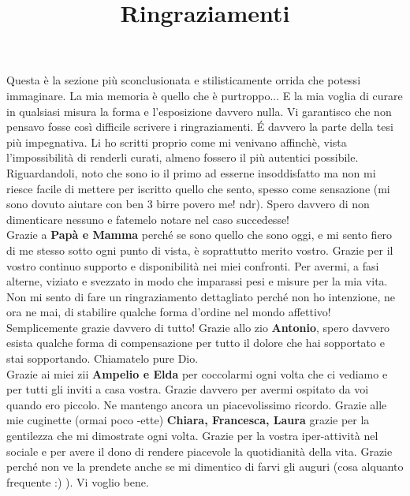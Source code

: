 \documentclass[10pt]{amsart}
\title{Ringraziamenti}
\newcommand{\n}[1]{{\Large \bf #1}}
\begin{document}
\maketitle
Questa è la sezione più sconclusionata e stilisticamente orrida che potessi immaginare. La mia memoria è quello che è purtroppo... E la mia voglia di curare in qualsiasi misura la forma e l'esposizione davvero nulla.
Vi garantisco che non pensavo fosse così difficile scrivere i ringraziamenti. \'E davvero la parte della tesi più impegnativa. Li ho scritti proprio come mi venivano affinchè, vista l'impossibilità di renderli curati, almeno fossero il più autentici possibile. Riguardandoli, noto che sono io il primo ad esserne insoddisfatto ma non mi riesce facile di mettere per iscritto quello che sento, spesso come sensazione (mi sono dovuto aiutare con ben 3 birre povero me! ndr). Spero davvero di non dimenticare nessuno e fatemelo notare nel caso succedesse!\\

Grazie a \n{Papà e Mamma} perché se sono quello che sono oggi, e mi sento fiero di me stesso sotto ogni punto di vista, è soprattutto merito vostro. Grazie per il vostro continuo supporto e disponibilità nei miei confronti. Per avermi, a fasi alterne, viziato e svezzato in modo che imparassi pesi e misure per la mia vita. Non mi sento di fare un ringraziamento dettagliato perché non ho intenzione, ne ora ne mai, di stabilire qualche forma d'ordine nel mondo affettivo! Semplicemente grazie davvero di tutto! Grazie allo zio \n{Antonio}, spero davvero esista qualche forma di compensazione per tutto il dolore che hai sopportato e stai sopportando. Chiamatelo pure Dio.\\

Grazie ai miei zii \n{Ampelio e Elda} per coccolarmi ogni volta che ci vediamo e per tutti gli inviti a casa vostra. Grazie davvero per avermi ospitato da voi quando ero piccolo. Ne mantengo ancora un piacevolissimo ricordo. Grazie alle mie cuginette (ormai poco -ette) \n{Chiara, Francesca, Laura} grazie per la gentilezza che mi dimostrate ogni volta. Grazie per la vostra iper-attività nel sociale e per avere il dono di rendere piacevole la quotidianità della vita. Grazie perché non ve la prendete anche se mi dimentico di farvi gli auguri (cosa alquanto frequente :) ). Vi voglio bene.\\
\end{document}
